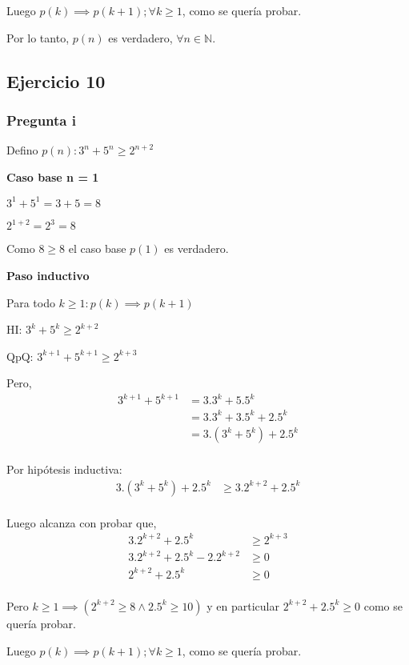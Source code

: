 Luego $p(k) \implies p(k+1); \forall k \geq 1$, como se quería probar.

Por lo tanto, $p(n)$ es verdadero, $\forall n \in \mathbb{N}$.

\subsection{Ejercicio 10}

\subsubsection{Pregunta i}

Defino $ p(n): 3^n + 5^n \geq 2^{n+2}$

\textbf{Caso base n = 1}

$3^1 + 5^1 = 3 + 5 = 8$

$2^{1+2} = 2^3 = 8$

Como $ 8 \geq 8 $ el caso base $p(1)$ es verdadero.

\textbf{Paso inductivo}

Para todo $k \geq 1: p(k) \implies p(k+1)$

HI: $ 3^k + 5^k \geq 2^{k+2}$

QpQ: $ 3^{k+1} + 5^{k+1} \geq 2^{k+3}$

Pero,
\begin{align*}
    3^{k+1} + 5^{k+1} &= 3.3^k + 5.5^k \\ 
    &= 3.3^k + 3.5^k + 2.5^k \\
    &= 3.(3^k + 5^k) + 2.5^k \\
\end{align*}

Por hipótesis inductiva:
\begin{align*}
    3.(3^k + 5^k) + 2.5^k &\geq 3.2^{k+2} + 2.5^k \\
\end{align*}

Luego alcanza con probar que,
\begin{align*}
    3.2^{k+2} + 2.5^k &\geq 2^{k+3} \\
    3.2^{k+2} + 2.5^k - 2.2^{k+2} &\geq 0 \\
    2^{k+2} + 2.5^k &\geq 0 \\
\end{align*}

Pero $k \geq 1 \implies (2^{k+2} \geq 8 \wedge 2.5^k \geq 10)$ y en particular $2^{k+2} + 2.5^k \geq 0 $ como se quería probar.

Luego $p(k) \implies p(k+1); \forall k \geq 1$, como se quería probar.

